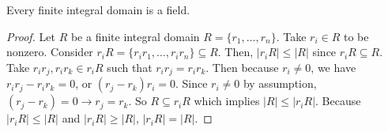 \documentclass [12pt] {article}
\newenvironment{theorem}[1]{\begin{tcolorbox}[title={Theorem #1},colback=green!5!white,colframe=black!75!green]}{\end{tcolorbox}}
\begin{document}
\begin{theorem}{}
    Every finite integral domain is a field.
\end{theorem}
\begin{proof}
    Let $R$ be a finite integral domain $R = \{  r_1, \ldots, r_n \}$. Take $r_i \in R$ to be
    nonzero. Consider $r_i R = \{ r_i r_1, \ldots, r_i r_n \} \subseteq R$. Then, $|r_i R| \leq |R|$
    since $r_i R \subseteq R$. Take $r_i r_j, r_i r_k \in r_i R$ such that  $r_i r_j = r_i r_k$.
    Then because $r_i \neq 0$, we have $r_i r_j - r_i r_k = 0$, or $(r_j - r_k) r_i = 0$. Since
    $r_i \neq 0$ by assumption, $(r_j - r_k) = 0 \to r_j = r_k$. So $R \subseteq r_i R$ which
    implies $|R| \leq |r_i R|$. Because $|r_i R| \leq |R|$ and $|r_i R| \geq |R|$, $|r_i R| = |R|$.
\end{proof}
\end{document}
